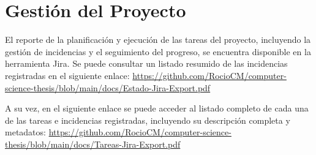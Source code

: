 \section{Gestión del Proyecto}

El reporte de la planificación y ejecución de las tareas del proyecto, incluyendo la gestión de incidencias y el seguimiento del progreso, se encuentra disponible en la herramienta Jira. Se puede consultar un listado resumido de las incidencias registradas en el siguiente enlace: \href{https://github.com/RocioCM/computer-science-thesis/blob/main/docs/Estado-Jira-Export.pdf}{https://github.com/RocioCM/computer-science-thesis/blob/main/docs/Estado-Jira-Export.pdf}

A su vez, en el siguiente enlace se puede acceder al listado completo de cada una de las tareas e incidencias registradas, incluyendo su descripción completa y metadatos: \href{https://github.com/RocioCM/computer-science-thesis/blob/main/docs/Tareas-Jira-Export.pdf}{https://github.com/RocioCM/computer-science-thesis/blob/main/docs/Tareas-Jira-Export.pdf}

